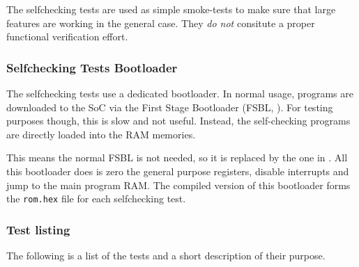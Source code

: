 
The selfchecking tests are used as simple smoke-tests to make sure
that large features are working in the general case.
They {\em do not} consitute a proper functional verification effort.

\subsubsection{Selfchecking Tests Bootloader}

The selfchecking tests use a dedicated bootloader.
In normal usage, programs are downloaded to the SoC via the
First Stage Bootloader (FSBL, ).
For testing purposes though, this is slow and not useful.
Instead, the self-checking programs are directly loaded into
the RAM memories.

This means the normal FSBL is not needed, so it is replaced by the one in
.
All this bootloader does is zero the general purpose registers,
disable interrupts and jump to the main program RAM.
The compiled version of this bootloader forms the {\tt rom.hex}
file for each selfchecking test.

\subsubsection{Test listing}

The following is a list of the tests and a short description of
their purpose.

